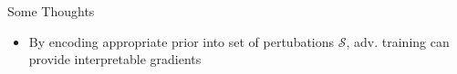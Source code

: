 \documentclass{beamer}
\begin{document}
\begin{frame}{Some Thoughts}
  \begin{itemize}
    \item By encoding appropriate prior into set of pertubations $\mathcal{S}$, adv. training can provide interpretable gradients 
  \end{itemize}
\end{frame}


\end{document}
